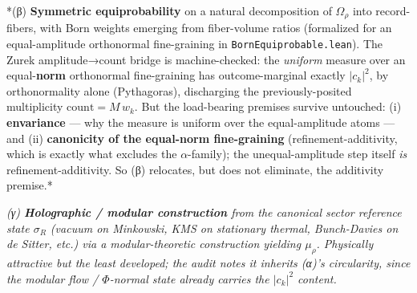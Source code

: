 \documentclass[11pt,a4paper]{article}
\begin{document}
*(β) \textbf{Symmetric equiprobability} on a natural decomposition of $\Omega_\rho$ into record-fibers, with Born weights emerging from fiber-volume ratios (formalized for an equal-amplitude orthonormal fine-graining in \texttt{BornEquiprobable.lean}). The Zurek amplitude→count bridge is machine-checked: the \emph{uniform} measure over an equal-\textbf{norm} orthonormal fine-graining has outcome-marginal exactly $|c_k|^2$, by orthonormality alone (Pythagoras), discharging the previously-posited multiplicity $\mathrm{count}=M\,w_k$. But the load-bearing premises survive untouched: (i) \textbf{envariance} — why the measure is uniform over the equal-amplitude atoms — and (ii) \textbf{canonicity of the equal-norm fine-graining} (refinement-additivity, which is exactly what excludes the $\alpha$-family); the unequal-amplitude step itself \emph{is} refinement-additivity. So (β) relocates, but does not eliminate, the additivity premise.*

\emph{(γ) \textbf{Holographic / modular construction} from the canonical sector reference state $\sigma_R$ (vacuum on Minkowski, KMS on stationary thermal, Bunch-Davies on de Sitter, etc.) via a modular-theoretic construction yielding $\mu_\rho$. Physically attractive but the least developed; the audit notes it inherits (α)'s circularity, since the modular flow / $\Phi$-normal state already carries the $|c_k|^2$ content.}
\end{document}
